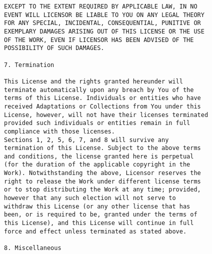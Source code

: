\begin{verbatim}
EXCEPT TO THE EXTENT REQUIRED BY APPLICABLE LAW, IN NO
EVENT WILL LICENSOR BE LIABLE TO YOU ON ANY LEGAL THEORY
FOR ANY SPECIAL, INCIDENTAL, CONSEQUENTIAL, PUNITIVE OR
EXEMPLARY DAMAGES ARISING OUT OF THIS LICENSE OR THE USE
OF THE WORK, EVEN IF LICENSOR HAS BEEN ADVISED OF THE
POSSIBILITY OF SUCH DAMAGES.

7. Termination

This License and the rights granted hereunder will
terminate automatically upon any breach by You of the
terms of this License. Individuals or entities who have
received Adaptations or Collections from You under this
License, however, will not have their licenses terminated
provided such individuals or entities remain in full
compliance with those licenses.
Sections 1, 2, 5, 6, 7, and 8 will survive any
termination of this License. Subject to the above terms
and conditions, the license granted here is perpetual
(for the duration of the applicable copyright in the
Work). Notwithstanding the above, Licensor reserves the
right to release the Work under different license terms
or to stop distributing the Work at any time; provided,
however that any such election will not serve to
withdraw this License (or any other license that has
been, or is required to be, granted under the terms of
this License), and this License will continue in full
force and effect unless terminated as stated above.

8. Miscellaneous


\end{verbatim}
